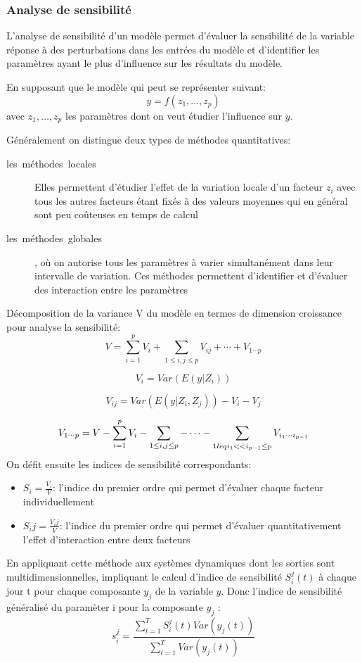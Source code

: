 \subsubsection{Analyse de sensibilité}
L'analyse de sensibilité d'un modèle permet d'évaluer la sensibilité de la
variable réponse à des perturbations dans les entrées du modèle et
d'identifier les paramètres ayant le plus d'influence
sur les résultats du modèle.

En supposant que le modèle qui peut se représenter suivant:
\[
  y = f(z_1,\dots,z_p)
\]
avec $z_1,\dots ,z_p$ les paramètres dont on veut étudier l'influence sur $y$.

Généralement on distingue deux types de méthodes quantitatives:
\begin{description}
  \item[les\ méthodes\ locales] Elles permettent d'étudier l'effet de la
variation locale d'un facteur $z_i$ avec tous les autres facteurs étant fixés à des valeurs moyennes qui en général sont peu coûteuses en temps de calcul
\item[les\ méthodes\ globales], où on autorise tous les paramètres à varier simultanément dans leur intervalle de variation. Ces méthodes permettent d'identifier et d'évaluer des interaction entre les paramètres
\end{description}
Décomposition de la variance V du modèle en termes de dimension croissance pour analyse la sensibilité:
\[ {V}=\sum_{i=1}^pV_i+\sum_{1\leq i,j \leq p} V_{ij}+\cdots +V_{1\cdots p}\]

\[ {V_i}=Var(E(y|Z_i))\]

\[ {V_{ij}}=Var(E(y|Z_i,Z_j))-V_i-V_j \]

\[ {V_{1\cdots p}}=V-\sum_{i=1}^p V_i-\sum_{1\leq i,j \leq p}-\cdots -\sum_{1\\leq i_1<\dot <i_{p-1}\leq p} V_{i_1 \cdots i_{p-1}} \]
On défit ensuite les indices de sensibilité correspondants:
\begin{itemize}
\item $S_i=\frac{V_i}{V}$: l'indice du premier ordre qui permet d'évaluer chaque facteur individuellement
\item $S_ij=\frac{V_ij}{V}$: l'indice du premier ordre qui permet d'évaluer quantitativement l'effet d'interaction entre deux facteurs
\end{itemize}
En appliquant cette méthode aux systèmes dynamiques dont les sorties sont multidimensionnelles, impliquant le calcul d'indice de sensibilité $S_i^j(t)$ à chaque jour t pour chaque composante $y_j$ de la variable $y$.
Donc l'indice de sensibilité généralisé du paramèter i  pour la composante $y_j$ :
\[ {s_i^j}=\frac{\sum_{t=1}^TS_i^j(t)Var(y_j(t))}{\sum_{t=1}^T Var(y_j(t))} \]
